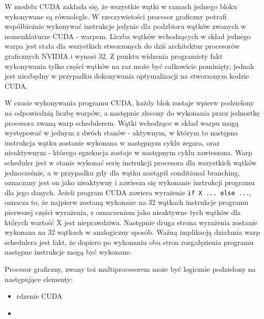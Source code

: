 W modelu CUDA zakłada się, że wszystkie wątki w ramach jednego bloku wykonywane
są równolegle. W rzeczywistości procesor graficzny potrafi współbieżnie wykonywać
instrukcje jedynie dla podzbioru wątków zwanych w nomenklaturze CUDA - warpem. 
Liczba wątków wchodzących w skład jednego warpa jest stała dla wszystkich stworzonych
do dziś architektur procesorów graficznych NVIDIA i wynosi 32. Z punktu
widzenia programisty fakt wykonywania tylko części wątków na raz może być
całkowicie pominięty, jednak jest niezbędny w przypadku dokonywania
optymalizacji na stworzonym kodzie CUDA\cite{kepler}.

W czasie wykonywania programu CUDA, każdy blok zostaje wpierw podzielony na odpowiednią
liczbę warpów, a następnie zlecony do wykonania przez jednostkę procesora zwaną warp
schedulerem. Wątki wchodzące w skład warpu mogą występować w jednym z dwóch stanów
- aktywnym, w którym to następna instrukcja wątku zostanie wykonana w następnym
cyklu zegara, oraz nieaktywnym - którego egzekucja zostaje w następnym cyklu
zawieszona. Warp scheduler jest w stanie wykonać serię instrukcji
procesora dla wszystkich wątków jednocześnie, a w przypadku gdy dla wątku
nastąpił conditional branching, oznaczany jest on jako nieaktywny i
zawiesza się wykonanie instrukcji programu dla jego danych. Jeżeli program CUDA
zawiera wyrażenie \texttt{if X {...} else {...}}, oznacza to, że najpierw zostaną
wykonane na 32 wątkach instrukcje programu pierwszej części wyrażenia,
		 z oznaczeniem jako nieaktywne tych wątków dla których wartość X jest
		 nieprawdziwa. Następnie druga strona wyrażenia zostanie wykonana na 32
		 wątkach w analogiczny sposób. Ważną implikacją działania warp
		 schedulera jest fakt, że dopiero po wykonaniu obu stron rozgałęzienia
		 programu następne instrukcje mogą być wykonane.


Procesor graficzny, zwany też multiprocesorem może być logicznie
podzielony na następujące elementy:
\begin{itemize}
\item rdzenie CUDA
\item 
\end{itemize}

